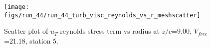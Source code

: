 \begin{figure}[H]
\centering
\texttt{[image: figs/run\_44/run\_44\_turb\_visc\_reynolds\_vs\_r\_meshscatter]}
\caption{Scatter plot of $
u_T$ reynolds stress term vs radius at $z/c$=9.00, $V_{free}$=21.18, station 5.}
\label{fig:run_44_turb_visc_reynolds_vs_r_meshscatter}
\end{figure}


